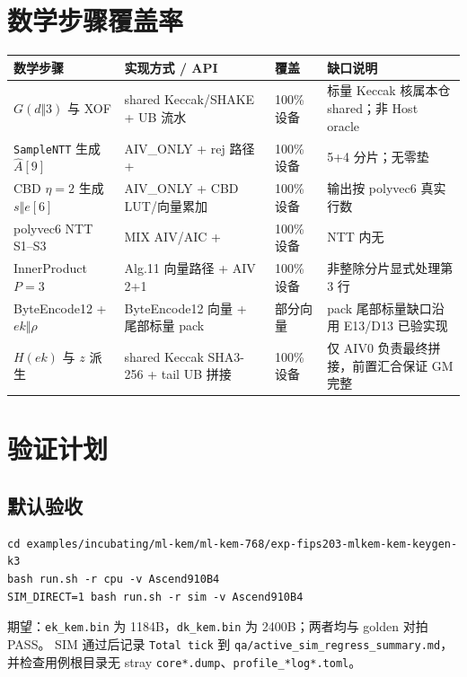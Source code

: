 \documentclass[UTF8,a4paper,11pt]{ctexart}
\newcommand{\apiname}[1]{\texttt{\seqsplit{#1}}}
\begin{document}
\section{数学步骤覆盖率}

\begin{longtable}{@{}L{4.4cm}L{4.0cm}L{2.0cm}L{2.8cm}@{}}
\toprule
数学步骤 & 实现方式 / API & 覆盖 & 缺口说明 \\
\midrule
$G(d\Vert3)$ 与 XOF & shared Keccak/SHAKE + UB 流水 & 100\% 设备 & 标量 Keccak 核属本仓 shared；非 Host oracle \\
\texttt{SampleNTT} 生成 $\hat A[9]$ & AIV\_ONLY + rej 路径 + \apiname{DataCopy} & 100\% 设备 & 5+4 分片；无零垫 \\
CBD $\eta=2$ 生成 $s\Vert e[6]$ & AIV\_ONLY + CBD LUT/向量累加 & 100\% 设备 & 输出按 polyvec6 真实行数 \\
polyvec6 NTT S1--S3 & MIX AIV/AIC + \apiname{Mmad} & 100\% 设备 & NTT 内无 \apiname{Gather} \\
InnerProduct $P=3$ & Alg.11 向量路径 + AIV 2+1 & 100\% 设备 & 非整除分片显式处理第 3 行 \\
ByteEncode12 + $ek\Vert\rho$ & ByteEncode12 向量 + 尾部标量 pack & 部分向量 & pack 尾部标量缺口沿用 E13/D13 已验实现 \\
$H(ek)$ 与 $z$ 派生 & shared Keccak SHA3-256 + tail UB 拼接 & 100\% 设备 & 仅 AIV0 负责最终拼接，前置汇合保证 GM 完整 \\
\bottomrule
\end{longtable}

\section{验证计划}

\subsection{默认验收}

\begin{verbatim}
cd examples/incubating/ml-kem/ml-kem-768/exp-fips203-mlkem-kem-keygen-k3
bash run.sh -r cpu -v Ascend910B4
SIM_DIRECT=1 bash run.sh -r sim -v Ascend910B4
\end{verbatim}

期望：\texttt{ek\_kem.bin} 为 1184B，\texttt{dk\_kem.bin} 为 2400B；两者均与 golden 对拍 PASS。
SIM 通过后记录 \texttt{Total tick} 到 \texttt{qa/active\_sim\_regress\_summary.md}，并检查用例根目录无 stray \texttt{core*.dump}、\texttt{profile\_*log*.toml}。
\end{document}

